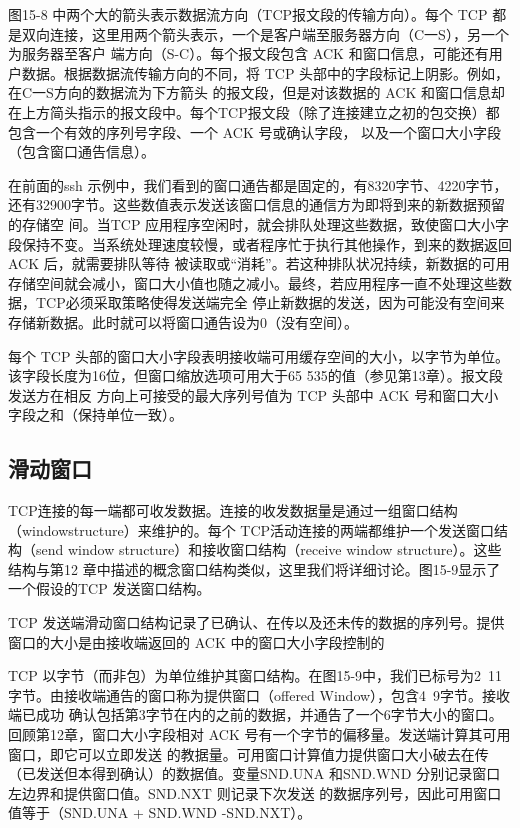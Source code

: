 图15-8 中两个大的箭头表示数据流方向（TCP报文段的传输方向）。每个 TCP 都是双向连接，这里用两个箭头表示，一个是客户端至服务器方向（C一S），另一个为服务器至客户
端方向（S-C）。每个报文段包含 ACK 和窗口信息，可能还有用户数据。根据数据流传输方向的不同，将 TCP 头部中的字段标记上阴影。例如，在C一S方向的数据流为下方箭头
的报文段，但是对该数据的 ACK 和窗口信息却在上方简头指示的报文段中。每个TCP报文段（除了连接建立之初的包交换）都包含一个有效的序列号字段、一个 ACK 号或确认字段，
以及一个窗口大小字段（包含窗口通告信息）。

在前面的ssh 示例中，我们看到的窗口通告都是固定的，有8320字节、4220字节，还有32900字节。这些数值表示发送该窗口信息的通信方为即将到来的新数据预留的存储空
间。当TCP 应用程序空闲时，就会排队处理这些数据，致使窗口大小字段保持不变。当系统处理速度较慢，或者程序忙于执行其他操作，到来的数据返回ACK 后，就需要排队等待
被读取或“消耗”。若这种排队状况持续，新数据的可用存储空间就会减小，窗口大小值也随之减小。最终，若应用程序一直不处理这些数据，TCP必须采取策略使得发送端完全
停止新数据的发送，因为可能没有空间来存储新数据。此时就可以将窗口通告设为0（没有空间）。

每个 TCP 头部的窗口大小字段表明接收端可用缓存空间的大小，以字节为单位。该字段长度为16位，但窗口缩放选项可用大于65 535的值（参见第13章）。报文段发送方在相反
方向上可接受的最大序列号值为 TCP 头部中 ACK 号和窗口大小字段之和（保持单位一致）。

\subsection{滑动窗口}
TCP连接的每一端都可收发数据。连接的收发数据量是通过一组窗口结构（windowstructure）来维护的。每个 TCP活动连接的两端都维护一个发送窗口结构（send window
structure）和接收窗口结构（receive window structure）。这些结构与第12 章中描述的概念窗口结构类似，这里我们将详细讨论。图15-9显示了一个假设的TCP 发送窗口结构。

TCP 发送端滑动窗口结构记录了已确认、在传以及还未传的数据的序列号。提供窗口的大小是由接收端返回的 ACK 中的窗口大小字段控制的

TCP 以字节（而非包）为单位维护其窗口结构。在图15-9中，我们已标号为2~11字节。由接收端通告的窗口称为提供窗口（offered Window），包含4~9字节。接收端已成功
确认包括第3字节在内的之前的数据，并通告了一个6字节大小的窗口。回顾第12章，窗口大小字段相对 ACK 号有一个字节的偏移量。发送端计算其可用窗口，即它可以立即发送
的教据量。可用窗口计算值力提供窗口大小破去在传（已发送但本得到确认）的数据值。变量SND.UNA 和SND.WND 分别记录窗口左边界和提供窗口值。SND.NXT 则记录下次发送
的数据序列号，因此可用窗口值等于（SND.UNA + SND.WND -SND.NXT）。

